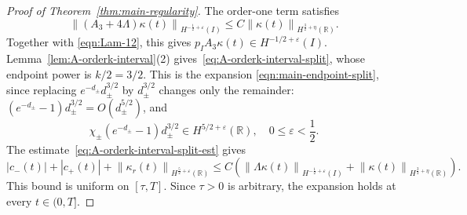 \documentclass[11pt,reqno]{amsart}
\theoremstyle{plain}
\theoremstyle{definition}
\numberwithin{equation}{section}
\newcommand{\paren}[1]{\left(#1\right)}
\newcommand{\norm}[1]{\left\lVert #1 \right\rVert}
\newcommand{\R}{\mathbb{R}}
\newcommand{\hi}[1]{H^{#1}(I)}
\newcommand{\hr}[1]{H^{#1}(\R)}
\begin{document}
\begin{proof}[Proof of Theorem~\ref{thm:main-regularity}]
The order-one term satisfies
\begin{equation}
    \norm{(A_3+4\Lambda)\kappa(t)}_{\hi{-\frac12+\varepsilon}}
    \le C\norm{\kappa(t)}_{\hr{\frac32+\eta}}.
\end{equation}
Together with \eqref{eqn:Lam-12}, this gives
$p_I A_3\kappa(t)\in H^{-1/2+\varepsilon}(I)$.
Lemma~\ref{lem:A-orderk-interval}(2) gives~\eqref{eq:A-orderk-interval-split},
whose endpoint power is $k/2=3/2$. This is the expansion
\eqref{eqn:main-endpoint-split}, since replacing $e^{-d_\pm}d_\pm^{3/2}$
by $d_\pm^{3/2}$ changes only the remainder:
$(e^{-d_\pm}-1)d_\pm^{3/2}=O(d_\pm^{5/2})$, and
\begin{equation*}
    \chi_\pm(e^{-d_\pm}-1)d_\pm^{3/2}
    \in H^{5/2+\varepsilon}(\R),\quad 0\le\varepsilon<\frac12.
\end{equation*}
The estimate~\eqref{eq:A-orderk-interval-split-est} gives
\begin{equation}\label{eqn:split-est}
    |c_-(t)|+|c_+(t)|+\norm{\kappa_r(t)}_{\hr{\frac52+\varepsilon}}
    \le C\paren{
        \norm{\Lambda\kappa(t)}_{\hi{-\frac12+\varepsilon}}
        +\norm{\kappa(t)}_{\hr{\frac32+\eta}}}.
\end{equation}
This bound is uniform on $[\tau,T]$. Since $\tau>0$ is arbitrary, the
expansion holds at every $t\in(0,T]$.
\end{proof}
\end{document}
